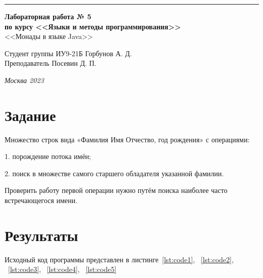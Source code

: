 \documentclass[a4paper, 14pt]{extarticle}
\begin{document}
\begin{titlepage}
\vspace*{-16pt}
\hspace{30pt}\rule{0.866\textwidth}{0.4pt}
  
\vspace{11em}

\begin{center}
\Large {\bf Лабораторная работа № 5} \\ 
\large {\bf по курсу <<Языки и методы программирования>>} \\
\large <<Монады в языке Java>> 
\end{center}\normalsize

\vspace{8em}


\begin{flushright}
  {Студент группы ИУ9-21Б Горбунов А. Д. \hspace*{15pt}\\ 
  \vspace{2ex}
  Преподаватель Посевин Д. П.\hspace*{15pt}}
\end{flushright}

\bigskip

\vfill
 

\begin{center}
\textsl{Москва 2023}
\end{center}
\end{titlepage}

\renewcommand{\ttdefault}{pcr}

\setlength{\tabcolsep}{3pt}
\newpage
\setcounter{page}{2}

\section{Задание}\label{Sect::task}
Множество строк вида «Фамилия Имя Отчество, год рождения» с операциями:

1. порождение потока имён;

2. поиск в множестве самого старшего обладателя указанной фамилии.

Проверить работу первой операции нужно путём поиска наиболее часто встречающегося имени.
\section{Результаты}\label{Sect::res}

Исходный код программы представлен в листинге~\ref{lst:code1}, ~\ref{lst:code2}, ~\ref{lst:code3}, ~\ref{lst:code4}, ~\ref{lst:code5}
\end{document}
